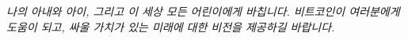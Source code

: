 
\newpage \vspace*{8cm}
\thispagestyle{empty}
\begin{center}
	\Large \emph{
		나의 아내와 아이, 그리고 이 세상 모든 어린이에게 바칩니다.
		비트코인이 여러분에게 도움이 되고, 싸울 가치가 있는 미래에 대한 비전을 제공하길 바랍니다. 
	}
\end{center}
